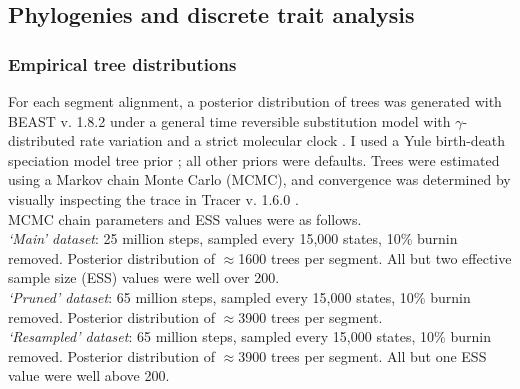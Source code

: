 \subsection*{Phylogenies and discrete trait analysis}
\subsubsection*{Empirical tree distributions}
For each segment alignment, a posterior distribution of trees was generated with BEAST v. 1.8.2 under a general time reversible substitution model with $\gamma$- distributed rate variation and a strict molecular clock \citep{drummond2012bayesian}.
I used a Yule birth-death speciation model tree prior \citep{gernhard2008using}; all other priors were defaults.
Trees were estimated using a Markov chain Monte Carlo (MCMC), and convergence was determined by visually inspecting the trace in Tracer v. 1.6.0 \citep{rambaut2014tracer}.\\
MCMC chain parameters and ESS values were as follows.\\
\noindent
\textit{`Main' dataset}: 25 million steps, sampled every 15,000 states, 10\% burnin removed. Posterior distribution of $\approx$1600 trees per segment. All but two effective sample size (ESS) values were well over 200. \\
\textit{`Pruned' dataset}: 65 million steps, sampled every 15,000 states, 10\% burnin removed. Posterior distribution of $\approx$3900 trees per segment. \\
\textit{`Resampled' dataset}: 65 million steps, sampled every 15,000 states, 10\% burnin removed. Posterior distribution of $\approx$3900 trees per segment. All but one ESS value were well above 200.

